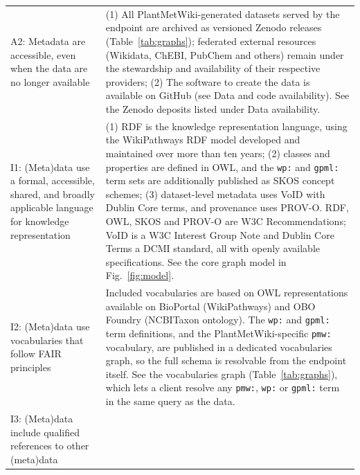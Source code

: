 \documentclass[11pt,a4paper]{article}
\newcommand{\rev}[1]{#1}
\begin{document}
{\begin{longtable}{p{} p{}}
A2: Metadata are accessible, even when the data are no longer available &
(1) All PlantMetWiki-generated datasets served by the endpoint are archived as versioned Zenodo
releases (Table~\ref{tab:graphs}); federated external resources (Wikidata, ChEBI, PubChem and
others) remain under the stewardship and availability of their respective providers;
(2) The software to create the data is available on GitHub (see Data and code availability).
\rev{See the Zenodo deposits listed under Data availability.} \\
\addlinespace
I1: (Meta)data use a formal, accessible, shared, and broadly applicable language for knowledge
representation &
(1) RDF is the knowledge representation language, using the WikiPathways RDF model developed
and maintained over more than ten years; (2) classes and properties are defined in OWL, and the
\texttt{wp:} and \texttt{gpml:} term sets are additionally published as SKOS concept schemes; (3)
dataset-level metadata uses VoID with Dublin Core terms, and provenance uses PROV-O. RDF, OWL, SKOS
and PROV-O are W3C Recommendations; VoID is a W3C Interest Group Note and Dublin Core Terms a DCMI
standard, all with openly available specifications.
\rev{See the core graph model in Fig.~\ref{fig:model}.} \\
\addlinespace
I2: (Meta)data use vocabularies that follow FAIR principles &
Included vocabularies are based on OWL representations available on BioPortal (WikiPathways) and OBO
Foundry (NCBITaxon ontology). The \texttt{wp:} and \texttt{gpml:} term definitions, and the
PlantMetWiki-specific \texttt{pmw:} vocabulary, are published in a dedicated vocabularies graph, so
the full schema is resolvable from the endpoint itself.
\rev{See the vocabularies graph (Table~\ref{tab:graphs}), which lets a client resolve
any \texttt{pmw:}, \texttt{wp:} or \texttt{gpml:} term in the same query as the data.} \\
\addlinespace
I3: (Meta)data include qualified references to other (meta)data &

\end{longtable}}
\end{document}

